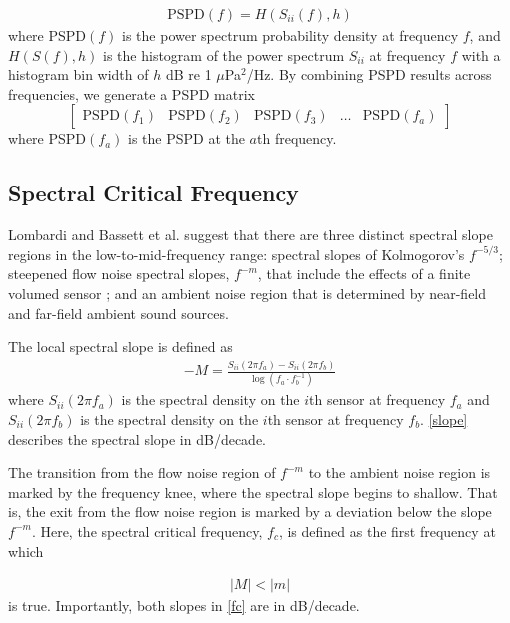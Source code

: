\documentclass[12pt,journal,onecolumn]{IEEEtran}
\begin{document}
\begin{align}
\text{PSPD}(f) = H(S_{ii}(f),h)
\label{PSPD_definition}
\end{align}
where PSPD$(f)$ is the power spectrum probability density at frequency $f$, and $H(S(f),h)$ is the histogram of the power spectrum $S_{ii}$ at frequency $f$ with a histogram bin width of $h$  dB re 1 $\mu$Pa$^2$/Hz. By combining PSPD results across frequencies, we generate a PSPD matrix 
\begin{equation}
\begin{bmatrix}
\text{PSPD}(f_1) & \text{PSPD}(f_2) & \text{PSPD}(f_3) & \dots &\text{PSPD}(f_a)
\end{bmatrix}
\label{PSPD_matrix}
\end{equation}
where PSPD$(f_a)$ is the PSPD at the $a$th frequency. 



\subsection{Spectral Critical Frequency}
Lombardi \cite{lombardi} and Bassett et al. \cite{bassett} suggest that there are three distinct spectral slope regions in the low-to-mid-frequency range: spectral slopes of Kolmogorov's $f^{-5/3}$; steepened flow noise spectral slopes, $f^{-m}$, that include the effects of a finite volumed sensor \cite{bassett}; and an ambient noise region that is determined by near-field and far-field ambient sound sources.

The local spectral slope is defined as
\begin{align}
-M = \frac{S_{ii}(2\pi f_a) - S_{ii}(2\pi f_b)}{\log(f_a \cdot f_b^{-1})}
\label{slope}
\end{align}
where $S_{ii}(2\pi f_a)$ is the spectral density on the $i$th sensor at frequency $f_a$ and $S_{ii}(2\pi f_b)$ is the spectral density on the $i$th sensor at frequency $f_b$. \eqref{slope} describes the spectral slope in dB/decade. %

The transition from the flow noise region of $f^{-m}$ to the ambient noise region is marked by the frequency knee, where the spectral slope begins to shallow. That is, the exit from the flow noise region is marked by a deviation below the slope $f^{-m}$. Here, the spectral critical frequency, $f_c$, is defined as the first frequency at which 

\begin{align}
|M| < |m|
\label{fc}
\end{align}
is true. Importantly, both slopes in \eqref{fc} are in dB/decade.
\end{document}
